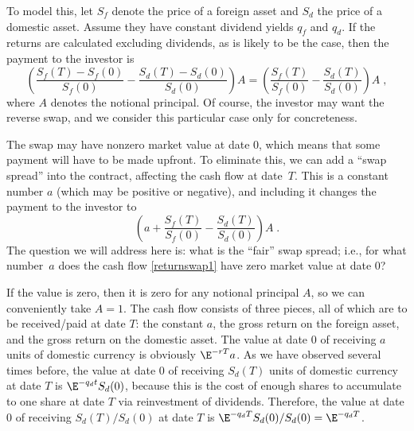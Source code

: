 To model this,  let $S_f$ denote the price of a foreign asset and $S_d$ the price of a domestic asset.  Assume they have constant dividend yields $q_f$ and $q_d$.  If the returns are calculated excluding dividends, as is likely to be the case, then the payment to the investor is
$$\left(\frac{S_f(T)-S_f(0)}{S_f(0)} - \frac{S_d(T)-S_d(0)}{S_d(0)}\right)  A = \left(\frac{S_f(T)}{S_f(0)} - \frac{S_d(T)}{S_d(0)}\right)  A\; ,$$
where $A$ denotes the notional principal.  Of course, the investor may want the reverse swap, and we consider this particular case only for concreteness.

The swap may have nonzero market value at date 0, which means that some payment will have to be made upfront.  To eliminate this, we can add a ``swap spread'' into the contract, affecting the cash flow at date~$T$.  This is a constant number $a$ (which may be positive or negative), and including it changes the payment to the investor to
\begin{equation}\label{returnswap1}
\left(a+\frac{S_f(T)}{S_f(0)} - \frac{S_d(T)}{S_d(0)}\right)  A\;.
\end{equation}
The question we will address here is: what is the ``fair'' swap spread; i.e.,  for what number~$a$ does the cash flow \eqref{returnswap1} have zero market value at date 0?

If the value is zero, then it is zero for any notional principal $A$, so we can conveniently take $A=1$.  The cash flow consists of three pieces, all of which are to be received/paid at date $T$: the constant $a$, the gross return on the foreign asset, and the gross return on the domestic asset.  The value at date 0 of receiving $a$ units of domestic currency is obviously $\E^{-rT}a$.  As we have observed several times before, the value at date 0 of receiving 
$S_d(T)$ units of domestic currency at date $T$ is $\E^{-q_d t}S_d(0)$, because this is the cost of enough shares to accumulate to one share at date $T$ via reinvestment of dividends.  Therefore, the value at date 0 of receiving $S_d(T)/S_d(0)$ at date $T$ is  $\E^{-q_dT}S_d(0)/S_d(0) = \E^{-q_dT}$.

